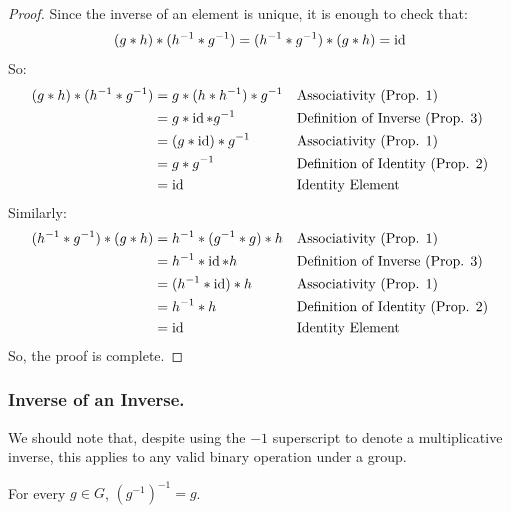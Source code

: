 \documentclass[letterpaper]{article}
\begin{document}
\begin{mdframed}
    \begin{proof}
        Since the inverse of an element is unique, it is enough to check that: 
        \[(g * h) * (h^{-1} * g^{-1}) = (h^{-1} * g^{-1}) * (g * h) = \operatorname{id}\]
        So: 
        \begin{equation*}
            \begin{aligned}
                (g * h) * (h^{-1} * g^{-1}) &= g * (h * h^{-1}) * g^{-1} && \text{Associativity (Prop. 1)} \\ 
                    &= g * \operatorname{id} * g^{-1} && \text{Definition of Inverse (Prop. 3)} \\ 
                    &= (g * \operatorname{id}) * g^{-1} && \text{Associativity (Prop. 1)} \\ 
                    &= g * g^{-1} && \text{Definition of Identity (Prop. 2)} \\ 
                    &= \operatorname{id} && \text{Identity Element}
            \end{aligned}
        \end{equation*}
        Similarly: 
        \begin{equation*}
            \begin{aligned}
                (h^{-1} * g^{-1}) * (g * h) &= h^{-1} * (g^{-1} * g) * h && \text{Associativity (Prop. 1)} \\ 
                    &= h^{-1} * \operatorname{id} * h && \text{Definition of Inverse (Prop. 3)} \\ 
                    &= (h^{-1} * \operatorname{id}) * h && \text{Associativity (Prop. 1)} \\ 
                    &= h^{-1} * h && \text{Definition of Identity (Prop. 2)} \\ 
                    &= \operatorname{id} && \text{Identity Element}
            \end{aligned}
        \end{equation*}
        So, the proof is complete. 
    \end{proof}
\end{mdframed}

\subsubsection{Inverse of an Inverse.}
We should note that, despite using the $-1$ superscript to denote a multiplicative inverse, this applies to any valid binary operation under a group. 

\begin{lemma}{}{}
    For every $g \in G$, $(g^{-1})^{-1} = g$. 
\end{lemma}
\end{document}
